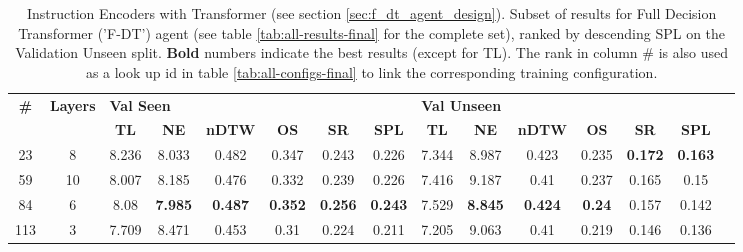 \begin{table}
\centering
\caption{\label{tab:instruction_encoding_full}Instruction Encoders with Transformer (see section \ref{sec:f_dt_agent_design}). Subset of results for Full Decision Transformer ('F-DT') agent (see table \ref{tab:all-results-final} for the complete set), ranked by descending SPL on the Validation Unseen split. \textbf{Bold} numbers indicate the best results (except for TL). The rank in column \# is also used as a look up id in table \ref{tab:all-configs-final} to link the corresponding training configuration.}
\begin{tabular}{@{\hskip3pt}c@{\hskip3pt}c@{\hskip3pt}c@{\hskip3pt}c@{\hskip3pt}c@{\hskip3pt}c@{\hskip3pt}c@{\hskip3pt}c@{\hskip3pt}c@{\hskip3pt}c@{\hskip3pt}c@{\hskip3pt}c@{\hskip3pt}c@{\hskip3pt}c@{\hskip3pt}c}
\toprule
                                  \textbf{\#} & \textbf{Layers} & \multicolumn{6}{l}{\textbf{Val Seen}} & \multicolumn{6}{l}{\textbf{Val Unseen}} \\
\cmidrule(l){3-8}\cmidrule(l){9-14}\textbf{~} &      \textbf{~} &       \textbf{TL} &     \textbf{NE} &   \textbf{nDTW} &     \textbf{OS} &     \textbf{SR} &    \textbf{SPL} &         \textbf{TL} &     \textbf{NE} &   \textbf{nDTW} &    \textbf{OS} &     \textbf{SR} &    \textbf{SPL} \\
\midrule
                                           23 &               8 &             8.236 &           8.033 &           0.482 &           0.347 &           0.243 &           0.226 &               7.344 &           8.987 &           0.423 &          0.235 &  \textbf{0.172} &  \textbf{0.163} \\
                                           59 &              10 &             8.007 &           8.185 &           0.476 &           0.332 &           0.239 &           0.226 &               7.416 &           9.187 &            0.41 &          0.237 &           0.165 &            0.15 \\
                                           84 &               6 &              8.08 &  \textbf{7.985} &  \textbf{0.487} &  \textbf{0.352} &  \textbf{0.256} &  \textbf{0.243} &               7.529 &  \textbf{8.845} &  \textbf{0.424} &  \textbf{0.24} &           0.157 &           0.142 \\
                                          113 &               3 &             7.709 &           8.471 &           0.453 &            0.31 &           0.224 &           0.211 &               7.205 &           9.063 &            0.41 &          0.219 &           0.146 &           0.136 \\
\bottomrule
\end{tabular}
\end{table}
